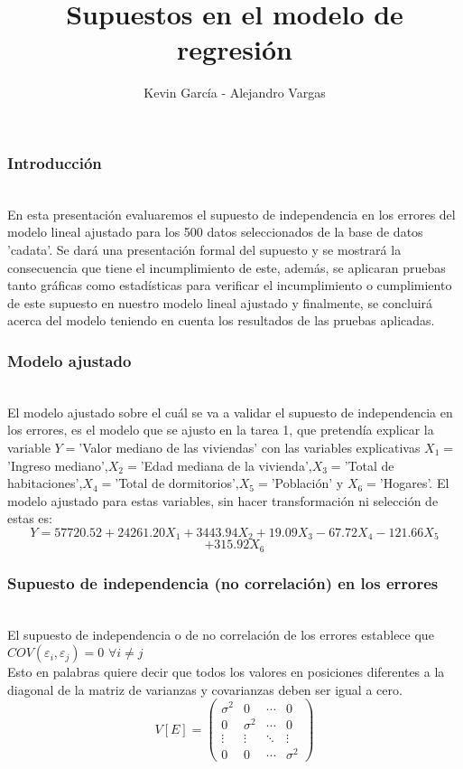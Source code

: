 \documentclass[12pt]{beamer}
\author{Kevin García - Alejandro Vargas}
\title{Supuestos en el modelo de regresión}
\begin{document}
\begin{frame}
\titlepage
\end{frame}

\begin{frame}
\frametitle{Introducción}
~\\En esta presentación evaluaremos el supuesto de independencia en los errores del modelo lineal ajustado para
los 500 datos seleccionados de la base de datos 'cadata'. Se dará una presentación formal del supuesto y se mostrará la consecuencia que tiene el incumplimiento de este, además, se aplicaran pruebas tanto gráficas como estadísticas para verificar el incumplimiento o cumplimiento de este supuesto en nuestro modelo lineal ajustado y finalmente, se concluirá acerca del modelo teniendo en cuenta los resultados de las pruebas aplicadas.
\end{frame}

\begin{frame}
\frametitle{Modelo ajustado}
~\\ El modelo ajustado sobre el cuál se va a validar el supuesto de independencia en los errores, es el modelo que se ajusto en la tarea 1, que pretendía explicar la variable $Y=$'Valor mediano de las viviendas' con las variables explicativas $X_{1}=$'Ingreso mediano',$X_{2}=$'Edad mediana de la vivienda',$X_{3}=$'Total de habitaciones',$X_{4}=$'Total de dormitorios',$X_{5}=$'Población' y $X_{6}=$'Hogares'. El modelo ajustado para estas variables, sin hacer transformación ni selección de estas es:
$$Y = 57720.52 + 24261.20X_{1} + 3443.94X_{2} + 19.09X_{3} - 67.72X_{4} - 121.66X_{5}$$ 
$$+315.92X_{6}$$
\end{frame}

\begin{frame}
\frametitle{Supuesto de independencia (no correlación) en los errores}
~\\ El supuesto de independencia o de no correlación de los errores establece que $COV(\varepsilon_{i},\varepsilon_{j})=0$ $\forall i\neq j$
~\\ Esto en palabras quiere decir que todos los valores en posiciones diferentes a la diagonal de la matriz de varianzas y covarianzas deben ser igual a cero.
~\\\[V[E]=
\left( \begin{array}{cccc}
 \sigma^2 & 0 & \cdots & 0 \\ 
 0 & \sigma^2 & \cdots & 0 \\
 \vdots & \vdots & \ddots & \vdots \\
 0 & 0 & \cdots & \sigma^2
\end{array} \right) \]

\end{frame}
\end{document}
